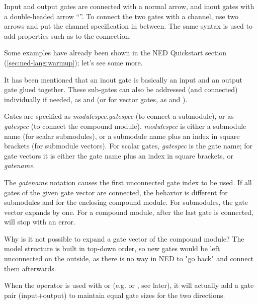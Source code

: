 Input and output gates are connected with a normal arrow, and inout gates
with a double-headed arrow ``\ttt{<-{}->}''. To connect the two gates
with a channel, use two arrows and put the channel specification in between.
The same syntax is used to add properties such as  to the
connection.

Some examples have already been shown in the NED Quickstart section
(\ref{sec:ned-lang:warmup}); let's see some more.



It has been mentioned that an inout gate is basically an input and an
output gate glued together. These sub-gates can also be addressed (and
connected) individually if needed, as  and  (or
for vector gates, as  and ).


Gates are specified as \textit{modulespec.gatespec} (to connect a submodule),
or as \textit{gatespec} (to connect the compound module). \textit{modulespec}
is either a submodule name (for scalar submodules), or a submodule name plus
an index in square brackets (for submodule vectors). For scalar gates,
\textit{gatespec} is the gate name; for gate vectors it is either the gate name
plus an index in square brackets, or \textit{gatename}\ttt{++}.

The \textit{gatename}\ttt{++} notation causes the first unconnected gate index
to be used. If all gates of the given gate vector are connected, the behavior
is different for submodules and for the enclosing compound module.
For submodules, the gate vector expands by one. For a compound module,
after the last gate is connected, \ttt{++} will stop with an error.

\begin{note}
    Why is it not possible to expand a gate vector of the compound
    module? The model structure is built in top-down order, so new gates
    would be left unconnected on the outside, as there is no way in NED to
    "go back" and connect them afterwards.
\end{note}

When the \ttt{++} operator is used with  or 
(e.g.  or , see later), it will actually add
a gate pair (input+output) to maintain equal gate sizes for the two
directions.



